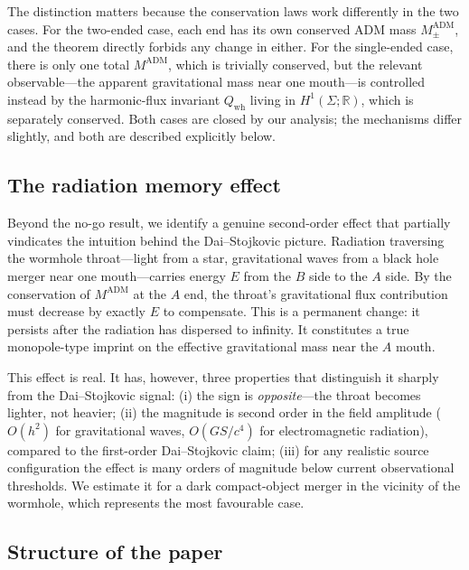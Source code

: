 \documentclass[aps,prd,onecolumn,nofootinbib,superscriptaddress]{revtex4-2}
\begin{document}
The distinction matters because the conservation laws work differently in the
two cases.  For the two-ended case, each end has its own conserved ADM mass
$M_\pm^{\mathrm{ADM}}$, and the theorem directly forbids any change in either.
For the single-ended case, there is only one total $M^{\mathrm{ADM}}$, which is
trivially conserved, but the relevant observable---the apparent gravitational
mass near one mouth---is controlled instead by the harmonic-flux invariant
$Q_{\mathrm{wh}}$ living in $H^1(\Sigma;\mathbb{R})$, which is separately
conserved.  Both cases are closed by our analysis; the mechanisms differ
slightly, and both are described explicitly below.

\subsection*{The radiation memory effect}

Beyond the no-go result, we identify a genuine second-order effect that
partially vindicates the intuition behind the Dai--Stojkovic picture.
Radiation traversing the wormhole throat---light from a star, gravitational
waves from a black hole merger near one mouth---carries energy $E$ from the $B$
side to the $A$ side.  By the conservation of $M^{\mathrm{ADM}}$ at the $A$
end, the throat's gravitational flux contribution must decrease by exactly $E$
to compensate.  This is a permanent change: it persists after the radiation has
dispersed to infinity.  It constitutes a true monopole-type imprint on the
effective gravitational mass near the $A$ mouth.

This effect is real.  It has, however, three properties that distinguish it
sharply from the Dai--Stojkovic signal: (i) the sign is \emph{opposite}---the
throat becomes lighter, not heavier; (ii) the magnitude is second order in the
field amplitude ($O(h^2)$ for gravitational waves, $O(G S/c^4)$ for
electromagnetic radiation), compared to the first-order Dai--Stojkovic claim;
(iii) for any realistic source configuration the effect is many orders of
magnitude below current observational thresholds.  We estimate it for a
dark compact-object merger in the vicinity of the wormhole, which represents
the most favourable case.

\subsection*{Structure of the paper}
\end{document}
